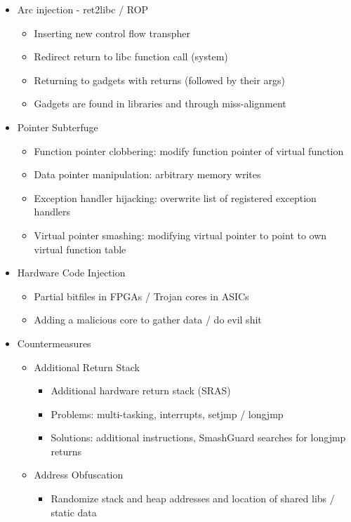 \documentclass[11pt, paper=a4, twocolumn]{scrartcl}
\begin{document}
\begin{itemize}
\begin{itemize}
				\end{itemize}
			\item Arc injection - ret2libc / ROP
				\begin{itemize}
					\item Inserting new control flow transpher
					\item Redirect return to libc function call (system)
					\item Returning to gadgets with returns (followed by their args)
					\item Gadgets are found in libraries and through miss-alignment
				\end{itemize}
			\item Pointer Subterfuge
				\begin{itemize}
					\item Function pointer clobbering: modify function pointer of virtual function
					\item Data pointer manipulation: arbitrary memory writes
					\item Exception handler hijacking: overwrite list of registered exception handlers
					\item Virtual pointer smashing: modifying virtual pointer to point to own virtual function table
				\end{itemize}
			\item Hardware Code Injection
				\begin{itemize}
					\item Partial bitfiles in FPGAs / Trojan cores in ASICs
					\item Adding a malicious core to gather data / do evil shit
				\end{itemize}
			\item Countermeasures
				\begin{itemize}
					\item Additional Return Stack
						\begin{itemize}
							\item Additional hardware return stack (SRAS)
							\item Problems: multi-tasking, interrupts, setjmp / longjmp
							\item Solutions: additional instructions, SmashGuard searches for longjmp returns
						\end{itemize}
					\item Address Obfuscation
						\begin{itemize}
							\item Randomize stack and heap addresses and location of shared libs / static data

\end{itemize}
\end{itemize}
\end{itemize}
\end{document}
